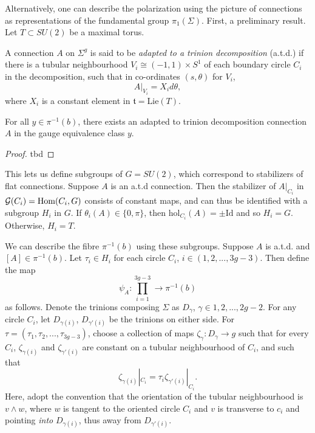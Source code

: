	Alternatively, one can describe the polarization using the picture of connections as representations of the fundamental group $\pi_1(\Sigma)$. First, a preliminary result. Let $T\subset SU(2)$ be a maximal torus.
	\begin{definition}
		A connection $A$ on $\Sigma^g$ is said to be \emph{adapted to a trinion decomposition} (a.t.d.) if there is a tubular neighbourhood $V_i \cong (-1,1)\times S^1$ of each boundary circle $C_i$ in the decomposition, such that in co-ordinates $(s,\theta)$ for $V_i$,
		\begin{equation}
			A|_{V_i} = X_i d\theta, 
		\end{equation}
		where $X_i$ is a constant element in $\mathfrak{t} = \text{Lie}(T)$.
	\end{definition}
	\begin{theorem}
		For all $y\in \pi^{-1}(b)$, there exists an adapted to trinion decomposition connection $A$ in the gauge equivalence class $y$.
	\end{theorem}
	\begin{proof}
	tbd
	\end{proof}
	
	This lets us define subgroups of $G=SU(2)$, which correspond to stabilizers of flat connections. Suppose $A$ is an a.t.d connection. Then the stabilizer of $A|_{C_i}$ in $\mathcal{G}(C_i) = \text{Hom}(C_i, G)$ consists of constant maps, and can thus be identified with a subgroup $H_i$ in $G$. If $\theta_i(A) \in \{0,\pi\}$, then $\text{hol}_{C_i}(A) = \pm\text{Id}$ and so $H_i = G$. Otherwise, $H_i = T$. 
	
	We can describe the fibre $\pi^{-1}(b)$ using these subgroups. Suppose $A$ is a.t.d. and $[A] \in \pi^{-1}(b)$. Let $\tau_i \in H_i$ for each circle $C_i$, $i\in (1,2,...,3g-3)$. Then define the map
	\begin{equation}
		\label{e:psiA}
		\psi_A : \prod_{i=1}^{3g-3} \to \pi^{-1}(b)
	\end{equation}
	as follows. Denote the trinions composing $\Sigma$ as $D_{\gamma}$, $\gamma\in{1,2,...,2g-2}$. For any circle $C_i$, let $D_{\gamma(i)}$, $D_{\gamma'(i)}$ be the trinions on either side. For $\tau=(\tau_1,\tau_2,...,\tau_{3g-3})$, choose a collection of maps $\zeta_\gamma : D_\gamma \to g$ such that for every $C_i$, $\zeta_{\gamma(i)}$ and $\zeta_{\gamma'(i)}$ are constant on a tubular neighbourhood of $C_i$, and such that
	\begin{equation}
		\zeta_{\gamma(i)}|_{C_i} = \tau_i \zeta_{\gamma'(i)}|_{C_i}.
	\end{equation}
	Here, adopt the convention that the orientation of the tubular neighbourhood is $v\wedge w$, where $w$ is tangent to the oriented circle $C_i$ and $v$ is transverse to $c_i$ and pointing \textit{into} $D_{\gamma(i)}$, thus away from $D_{\gamma'(i)}$.
	
